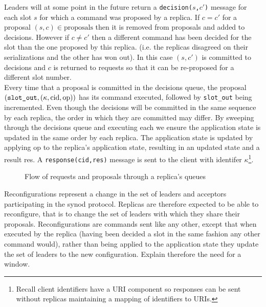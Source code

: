 Leaders will at some point in the future return a \texttt{decision($s$,$c'$)} message for each slot $s$ for which a command was proposed by a replica. If $c = c'$ for a proposal $\left(s,c\right) \in \textrm{proposals}$ then it is removed from proposals and added to decisions. However if $c \neq c'$ then a different command has been decided for the slot than the one proposed by this replica. (i.e. the replicas disagreed on their serializations and the other has won out). In this case $\left(s,c'\right)$ is committed to decisions and $c$ is returned to requests so that it can be re-proposed for a different slot number. \\

Every time that a proposal is committed in the decisions queue, the proposal $\left( \textrm{\texttt{slot\_out}}, \left( \kappa, \textrm{cid}, \textrm{op} \right) \right)$ has its command executed, followed by \texttt{slot\_out} being incremented. Even though the decisions will be committed in the same sequence by each replica, the order in which they are committed may differ. By sweeping through the decisions queue and executing each we ensure the application state is updated in the same order by each replica. The application state is updated by applying op to the replica's application state, resulting in an updated state and a result res. A \texttt{response(cid,res)} message is sent to the client with identifer $\kappa$\footnote{Recall client identifiers have a URI component so responses can be sent without replicas maintaining a mapping of identifiers to URIs.}. \\

\begin{figure}
  \scalebox{0.7}{
    }
  \caption{Flow of requests and proposals through a replica's queues}
  \label{fig:replica-queues}
\end{figure}
  
Reconfigurations represent a change in the set of leaders and acceptors participating in the synod protocol. Replicas are therefore expected to be able to reconfigure, that is to change the set of leaders with which they share their proposals. Reconfigurations are commands sent like any other, except that when executed by the replica (having been decided a slot in the same fashion any other command would), rather than being applied to the application state they update the set of leaders to the new configuration. {\color{red}Explain therefore the need for a window}. \\

